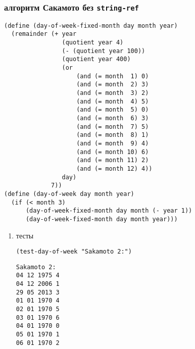\documentclass[11pt]{article}
\begin{document}
\subsubsection{алгоритм Сакамото без \texttt{string-ref}}
\label{sec:org9b5b7c0}
\begin{verbatim}
(define (day-of-week-fixed-month day month year)
  (remainder (+ year
                (quotient year 4)
                (- (quotient year 100))
                (quotient year 400)
                (or
                    (and (= month  1) 0)
                    (and (= month  2) 3)
                    (and (= month  3) 2)
                    (and (= month  4) 5)
                    (and (= month  5) 0)
                    (and (= month  6) 3)
                    (and (= month  7) 5)
                    (and (= month  8) 1)
                    (and (= month  9) 4)
                    (and (= month 10) 6)
                    (and (= month 11) 2)
                    (and (= month 12) 4))
                day)
             7))
(define (day-of-week day month year)
  (if (< month 3)
      (day-of-week-fixed-month day month (- year 1))
      (day-of-week-fixed-month day month year)))
\end{verbatim}
\begin{enumerate}
\item тесты
\label{sec:orgedf5e42}
\begin{verbatim}
(test-day-of-week "Sakamoto 2:")
\end{verbatim}

\begin{verbatim}
Sakamoto 2:
04 12 1975 4
04 12 2006 1
29 05 2013 3
01 01 1970 4
02 01 1970 5
03 01 1970 6
04 01 1970 0
05 01 1970 1
06 01 1970 2

\end{verbatim}
\end{enumerate}
\end{document}
